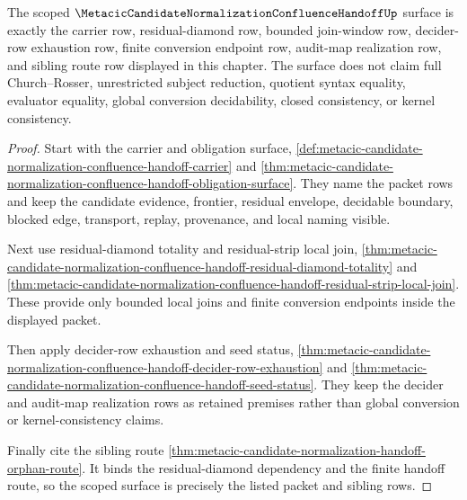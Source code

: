 \begin{theorem}
\label{thm:metacic-candidate-normalization-confluence-scoped-surface}
The scoped $\MetacicCandidateNormalizationConfluenceHandoffUp$ surface is exactly the carrier row, residual-diamond row, bounded join-window row, decider-row exhaustion row, finite conversion endpoint row, audit-map realization row, and sibling route row displayed in this chapter. The surface does not claim full Church--Rosser, unrestricted subject reduction, quotient syntax equality, evaluator equality, global conversion decidability, closed consistency, or kernel consistency.
\end{theorem}
\begin{proof}
Start with the carrier and obligation surface, \autoref{def:metacic-candidate-normalization-confluence-handoff-carrier} and \autoref{thm:metacic-candidate-normalization-confluence-handoff-obligation-surface}. They name the packet rows and keep the candidate evidence, frontier, residual envelope, decidable boundary, blocked edge, transport, replay, provenance, and local naming visible.

Next use residual-diamond totality and residual-strip local join, \autoref{thm:metacic-candidate-normalization-confluence-handoff-residual-diamond-totality} and \autoref{thm:metacic-candidate-normalization-confluence-handoff-residual-strip-local-join}. These provide only bounded local joins and finite conversion endpoints inside the displayed packet.

Then apply decider-row exhaustion and seed status, \autoref{thm:metacic-candidate-normalization-confluence-handoff-decider-row-exhaustion} and \autoref{thm:metacic-candidate-normalization-confluence-handoff-seed-status}. They keep the decider and audit-map realization rows as retained premises rather than global conversion or kernel-consistency claims.

Finally cite the sibling route \autoref{thm:metacic-candidate-normalization-handoff-orphan-route}. It binds the residual-diamond dependency and the finite handoff route, so the scoped surface is precisely the listed packet and sibling rows.
\end{proof}


